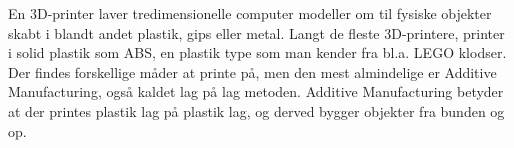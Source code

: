 En 3D-printer laver tredimensionelle computer modeller om til fysiske objekter skabt i blandt andet plastik, gips eller metal. Langt de fleste 3D-printere, printer i solid plastik som ABS, en plastik type som man kender fra bl.a. LEGO klodser. Der findes forskellige måder at printe på, men den mest almindelige er Additive Manufacturing, også kaldet lag på lag metoden. Additive Manufacturing betyder at der printes plastik lag på plastik lag, og derved bygger objekter fra bunden og op. 
